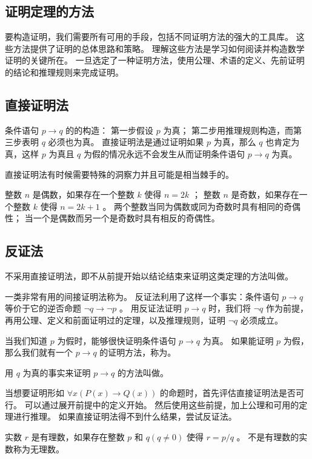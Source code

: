 {    \subsection{证明定理的方法}
    {
        要构造证明，我们需要所有可用的手段，包括不同证明方法的强大的工具库。
        这些方法提供了证明的总体思路和策略。
        理解这些方法是学习如何阅读并构造数学证明的关键所在。
        一旦选定了一种证明方法，使用公理、术语的定义、先前证明的结论和推理规则来完成证明。
    }

    \subsection{直接证明法}
    {
        条件语句 $p \rightarrow q$ 的的构造：
        第一步假设 $p$ 为真；
        第二步用推理规则构造，而第三步表明 $q$ 必须也为真。
        直接证明法是通过证明如果 $p$ 为真，那么 $q$ 也肯定为真，这样 $p$ 为真且 $q$ 为假的情况永远不会发生从而证明条件语句 $p \rightarrow q$ 为真。

        直接证明法有时候需要特殊的洞察力并且可能是相当棘手的。

        \begin{defines}
            整数 $n$ 是偶数，如果存在一个整数 $k$ 使得 $n = 2k$ ；
            整数 $n$ 是奇数，如果存在一个整数 $k$ 使得 $n = 2k + 1$ 。
            两个整数当同为偶数或同为奇数时具有相同的奇偶性；
            当一个是偶数而另一个是奇数时具有相反的奇偶性。
        \end{defines}
    }

    \subsection{反证法}
    {
        不采用直接证明法，即不从前提开始以结论结束来证明这类定理的方法叫做。

        一类非常有用的间接证明法称为。
        反证法利用了这样一个事实：条件语句 $p \rightarrow q$ 等价于它的逆否命题 $\neg q \rightarrow \neg p$ 。
        用反证法证明 $p \rightarrow q$ 时，我们将 $\neg q$ 作为前提，再用公理、定义和前面证明过的定理，以及推理规则，证明 $\neg q$ 必须成立。

        {
            当我们知道 $p$ 为假时，能够很快证明条件语句 $p \rightarrow q$ 为真。
            如果能证明 $p$ 为假，那么我们就有一个 $p \rightarrow q$ 的证明方法，称为。

            用 $q$ 为真的事实来证明 $p \rightarrow q$ 的方法叫做。
        }

        {
            当想要证明形如 $\forall x (P(x) \rightarrow Q(x))$ 的命题时，首先评估直接证明法是否可行。
            可以通过展开前提中的定义开始。
            然后使用这些前提，加上公理和可用的定理进行推理。
            如果直接证明法得不到什么结果，尝试反证法。
        }

        \begin{defines}
            实数 $r$ 是有理数，如果存在整数 $p$ 和 $q (q \neq 0)$ 使得 $r = p / q$ 。
            不是有理数的实数称为无理数。
        \end{defines}
    }
}